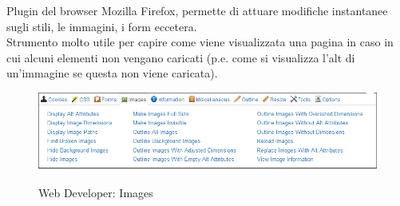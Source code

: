 Plugin del browser Mozilla Firefox, permette di attuare modifiche instantanee sugli stili, le immagini, i form eccetera.\\
Strumento molto utile per capire come viene visualizzata una pagina in caso in cui alcuni elementi non vengano caricati (p.e. come si visualizza l'alt di un'immagine se questa non viene caricata). 
\begin{figure}[!h]
	\centering
	\includegraphics[width=0.7\linewidth]{sezioni/FaseTest/Immagini/web_developer.png}\\
	\caption{Web Developer: Images}
	\label{Fig:webDev}
\end{figure} 